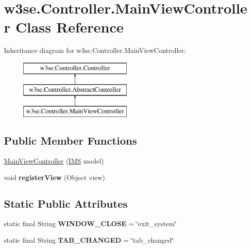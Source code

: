 \hypertarget{classw3se_1_1_controller_1_1_main_view_controller}{\section{w3se.\-Controller.\-Main\-View\-Controller Class Reference}
\label{classw3se_1_1_controller_1_1_main_view_controller}
}
Inheritance diagram for w3se.\-Controller.\-Main\-View\-Controller\-:\begin{figure}[H]
\begin{center}
\leavevmode
\includegraphics[height=3.000000cm]{classw3se_1_1_controller_1_1_main_view_controller}
\end{center}
\end{figure}
\subsection*{Public Member Functions}
\begin{DoxyCompactItemize}
\item 
\hyperlink{classw3se_1_1_controller_1_1_main_view_controller_af9fda7fcd26c10fdda756f750bd33d2f}{Main\-View\-Controller} (\hyperlink{classw3se_1_1_model_1_1_i_m_s}{I\-M\-S} model)
\item 
\hypertarget{classw3se_1_1_controller_1_1_main_view_controller_aa1630915062a05ed20627161cf8a74f9}{void {\bfseries register\-View} (Object view)}\label{classw3se_1_1_controller_1_1_main_view_controller_aa1630915062a05ed20627161cf8a74f9}

\end{DoxyCompactItemize}
\subsection*{Static Public Attributes}
\begin{DoxyCompactItemize}
\item 
\hypertarget{classw3se_1_1_controller_1_1_main_view_controller_aadb8a7424213fbd60ac27063a8fca6ba}{static final String {\bfseries W\-I\-N\-D\-O\-W\-\_\-\-C\-L\-O\-S\-E} = \char`\"{}exit\-\_\-system\char`\"{}}\label{classw3se_1_1_controller_1_1_main_view_controller_aadb8a7424213fbd60ac27063a8fca6ba}

\item 
\hypertarget{classw3se_1_1_controller_1_1_main_view_controller_a6dee2eafdb5d7df4d6871a0bc528bbca}{static final String {\bfseries T\-A\-B\-\_\-\-C\-H\-A\-N\-G\-E\-D} = \char`\"{}tab\-\_\-changed\char`\"{}}\label{classw3se_1_1_controller_1_1_main_view_controller_a6dee2eafdb5d7df4d6871a0bc528bbca}

\end{DoxyCompactItemize}
